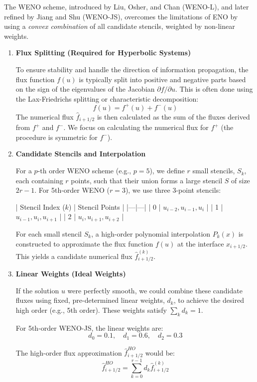 \documentclass[10pt,a4paper]{article}
\begin{document}
\begin{description}
\begin{description}
The WENO scheme, introduced by Liu, Osher, and Chan (WENO-L), and later refined by Jiang and Shu (WENO-JS), overcomes the limitations of ENO by using a \textit{convex combination} of all candidate stencils, weighted by non-linear weights.\cite{eno}

\begin{enumerate}

\item \textbf{Flux Splitting (Required for Hyperbolic Systems)}

To ensure stability and handle the direction of information propagation, the flux function $f(u)$ is typically split into positive and negative parts based on the sign of the eigenvalues of the Jacobian $\partial f / \partial u$. This is often done using the Lax-Friedrichs splitting or characteristic decomposition:
$$f(u) = f^+(u) + f^-(u)$$
The numerical flux $\hat{f}_{i+1/2}$ is then calculated as the sum of the fluxes derived from $f^+$ and $f^-$. We focus on calculating the numerical flux for $f^+$ (the procedure is symmetric for $f^-$).

\item \textbf{Candidate Stencils and Interpolation}

For a $p$-th order WENO scheme (e.g., $p=5$), we define $r$ small stencils, $S_k$, each containing $r$ points, such that their union forms a large stencil $S$ of size $2r-1$. For 5th-order WENO ($r=3$), we use three 3-point stencils:

| Stencil Index ($k$) | Stencil Points |
|---|---|
| 0 | $u_{i-2}, u_{i-1}, u_i$ |
| 1 | $u_{i-1}, u_i, u_{i+1}$ |
| 2 | $u_i, u_{i+1}, u_{i+2}$ |

For each small stencil $S_k$, a high-order polynomial interpolation $P_k(x)$ is constructed to approximate the flux function $f(u)$ at the interface $x_{i+1/2}$. This yields a candidate numerical flux $\hat{f}_{i+1/2}^{(k)}$.

\item  \textbf{Linear Weights (Ideal Weights)}

If the solution $u$ were perfectly smooth, we could combine these candidate fluxes using fixed, pre-determined linear weights, $d_k$, to achieve the desired high order (e.g., 5th order). These weights satisfy $\sum_{k} d_k = 1$.

For 5th-order WENO-JS, the linear weights are:
$$d_0 = 0.1, \quad d_1 = 0.6, \quad d_2 = 0.3$$

The high-order flux approximation $\hat{f}_{i+1/2}^{HO}$ would be:
$$\hat{f}_{i+1/2}^{HO} = \sum_{k=0}^{r-1} d_k \hat{f}_{i+1/2}^{(k)}$$


\end{enumerate}
\end{description}
\end{description}
\end{document}
